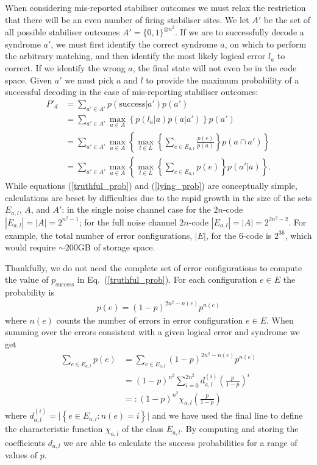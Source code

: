 When considering mis-reported stabiliser outcomes we must relax the restriction that there will be an even number of firing stabiliser sites. We let $A'$ be the set of all possible stabiliser outcomes $A' = \{0, 1\}^{\otimes n^2}$. If we are to successfully decode a syndrome $a'$, we must first identify the correct syndrome $a$, on which to perform the arbitrary matching, and then identify the most likely logical error $l_a$ to correct. If we identify the wrong $a$, the final state will not even be in the code space. Given $a'$ we must pick $a$ and $l$ to provide the maximum probability of a successful decoding in the case of mis-reporting stabiliser outcomes:
\begin{align}
  P'_d &= \sum_{a' \in A'} p(\text{success} \vert a') p(a') \\
  &= \sum_{a'\in A'} \max_{a \in A} \left\{ p(l_a \vert a) p(a \vert a') \right\} p(a')\\
  &= \sum_{a'\in A'} \max_{a \in A} \left\{ \max_{l \in L} \left\{\sum_{e \in E_{a,l}} \frac{p(e)}{p(a)} \right\} p(a \cap a') \right\}\\
  &= \sum_{a'\in A'} \max_{a \in A} \left\{ \max_{l \in L} \left\{\sum_{e \in E_{a,l}} p(e) \right\} p(a' \vert a) \right\}. \label{lying_prob}
\end{align}
While equations (\ref{truthful_prob}) and (\ref{lying_prob}) are conceptually simple, calculations are beset by difficulties due to the rapid growth in the size of the sets $E_{a,l}$, $A$, and $A'$: in the single noise channel case for the $2n$-code $|E_{a,l}| = |A| = 2^{n^2-1}$; for the full noise channel $2n$-code $|E_{a,l}| = |A| = 2^{2n^2 - 2}$. For example, the total number of error configurations, $|E|$, for the $6$-code is $2^{36}$, which would require $\sim200$GB of storage space.

Thankfully, we do not need the complete set of error configurations to compute the value of $p_\text{success}$ in Eq.~(\ref{truthful_prob}). For each configuration $e\in E$ the probability is
\begin{align}
  p(e) = (1-p)^{2n^2 - n(e)} p^{n(e)}
\end{align}
where $n(e)$ counts the number of errors in error configuration $e \in E$. When summing over the errors consistent with a given logical error and syndrome we get
\begin{align}
  \sum_{e \in E_{a,l}} p(e) &= \sum_{e \in E_{a,l}} (1-p)^{2n^2 - n(e)} p^{n(e)} \\
  &= (1-p)^{n^2} \sum_{i = 0}^{2n^2} d_{a,l}^{(i)} \left(\frac{p}{1-p}\right)^i \\
  &=: (1-p)^{n^2} \chi_{a,l}\left(\frac{p}{1-p}\right)
\end{align}
where $d_{a,l}^{(i)} = \vert \left\{e \in E_{a,l} : n(e)=i \right\} \vert$ and we have used the final line to define the characteristic function $\chi_{a,l}$ of the class $E_{a,l}$. By computing and storing the coefficients $d_{a,l}$ we are able to calculate the success probabilities for a range of values of $p$.

